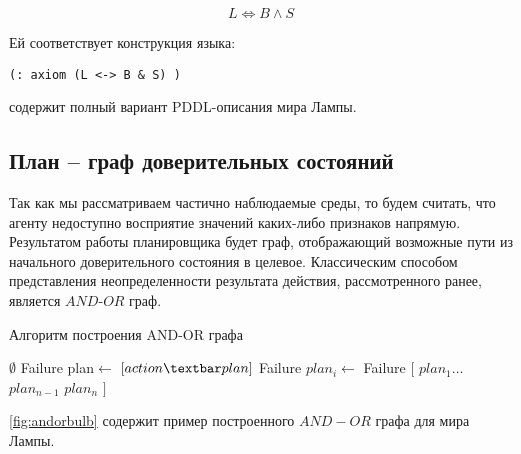 \begin{equation} L \iff B \land S \end{equation}

Ей соответствует конструкция языка:

\begin{verbatim}
(: axiom (L <-> B & S) )
\end{verbatim}

 содержит полный вариант PDDL-описания мира Лампы.

\subsection{План -- граф доверительных состояний}

Так как мы рассматриваем частично наблюдаемые среды, то будем считать,
что агенту недоступно восприятие значений каких-либо признаков напрямую.
Результатом работы планировщика будет граф, отображающий возможные пути
из начального доверительного состояния в целевое. Классическим способом
представления неопределенности результата действия, рассмотренного
ранее, является $AND$-$OR$ граф.

\begin{algorithm}
  \caption{Алгоритм построения AND-OR графа}
  \begin{algorithmic}
    \State \Return {}
   \EndFunction
     \State \Return $\emptyset$ \EndIf
     \State \Return Failure \EndIf
    \State plan$\gets$ 
     \State \Return $[action \textbar plan]$ \EndIf
    \EndFor
    \State \Return Failure
   \EndFunction
      \State $plan_i \gets$ 
       \State \Return Failure \EndIf
    \EndFor
    \State \Return $[$  $plan_1 \dots$   $plan_{n-1}$ \Else $plan_n$ \EndIf $]$
   \EndFunction
  \end{algorithmic}
\end{algorithm}

\autoref{fig:andorbulb} содержит пример построенного $AND-OR$ графа для мира Лампы.

